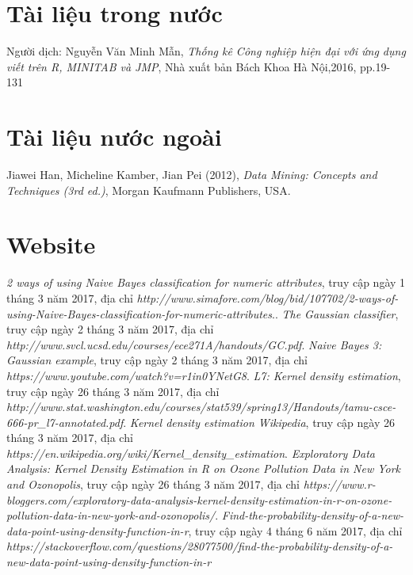 \documentclass[a4paper, 13pt]{report}
\begin{document}
\cleardoublepage
{}
\begin{thebibliography}{9}
\section*{Tài liệu trong nước}
	Người dịch: Nguyễn Văn Minh Mẫn, 
	\emph{Thống kê Công nghiệp hiện đại với ứng dụng viết trên R, MINITAB và JMP},
	Nhà xuất bản Bách Khoa Hà Nội,2016, pp.19-131
\section*{Tài liệu nước ngoài}
	Jiawei Han, Micheline Kamber, Jian Pei (2012),
	\emph{Data Mining: Concepts and Techniques (3rd ed.)},
	Morgan Kaufmann Publishers, USA.
\section*{Website}
	\emph{2 ways of using Naive Bayes classification for numeric attributes}, truy cập ngày 1 tháng 3 năm 2017,
	địa chỉ \emph{http://www.simafore.com/blog/bid/107702/2-ways-of-using-Naive-Bayes-classification-for-numeric-attributes}..
	\emph{The Gaussian classifier}, truy cập ngày 2 tháng 3 năm 2017,
	địa chỉ \emph{http://www.svcl.ucsd.edu/courses/ece271A/handouts/GC.pdf}.
	\emph{Naive Bayes 3: Gaussian example}, truy cập ngày 2 tháng 3 năm 2017,
	địa chỉ \emph{https://www.youtube.com/watch?v=r1in0YNetG8}.	
	\emph{L7: Kernel density estimation}, truy cập ngày 26 tháng 3 năm 2017,
	địa chỉ \emph{http://www.stat.washington.edu/courses/stat539/spring13/Handouts/tamu-csce-666-pr\_l7-annotated.pdf}.	
	\emph{Kernel density estimation Wikipedia}, truy cập ngày 26 tháng 3 năm 2017,
	địa chỉ \emph{https://en.wikipedia.org/wiki/Kernel\_density\_estimation}.
	\emph{Exploratory Data Analysis: Kernel Density Estimation in R on Ozone Pollution Data in New York and Ozonopolis}, truy cập ngày 26 tháng 3 năm 2017,
	địa chỉ \emph{https://www.r-bloggers.com/exploratory-data-analysis-kernel-density-estimation-in-r-on-ozone-pollution-data-in-new-york-and-ozonopolis/}.
	\emph{Find-the-probability-density-of-a-new-data-point-using-density-function-in-r}, truy cập ngày 4 tháng 6 năm 2017,
	địa chỉ \emph{https://stackoverflow.com/questions/28077500/find-the-probability-density-of-a-new-data-point-using-density-function-in-r}

\end{thebibliography}
\end{document}
